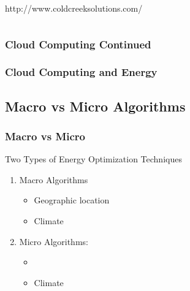 \documentclass{beamer}
\begin{document}
\begin{frame}
\begin{columns}
\begin{column}{0.45\textwidth}
	\tiny{
		\begin{flushright}
			http://www.coldcreeksolutions.com/
		\end{flushright}
	}
\end{column}
\end{columns}
\end{frame}

\begin{frame}
  \frametitle{Cloud Computing Continued}
 

\end{frame}

\begin{frame}
  \frametitle{Cloud Computing and Energy}
 

\end{frame}

\subsection{Macro vs Micro Algorithms}

\begin{frame}
  \frametitle{Macro vs Micro}
 	Two Types of Energy Optimization Techniques
 		\begin{enumerate}
 			\item Macro Algorithms
 				\begin{itemize}
 					\item Geographic location
 					\item Climate
 				\end{itemize}
 			\item Micro Algorithms:
 				\begin{itemize}
 					\item 
 					\item Climate
 				\end{itemize}
 		\end{enumerate}

\end{frame}
\end{document}
